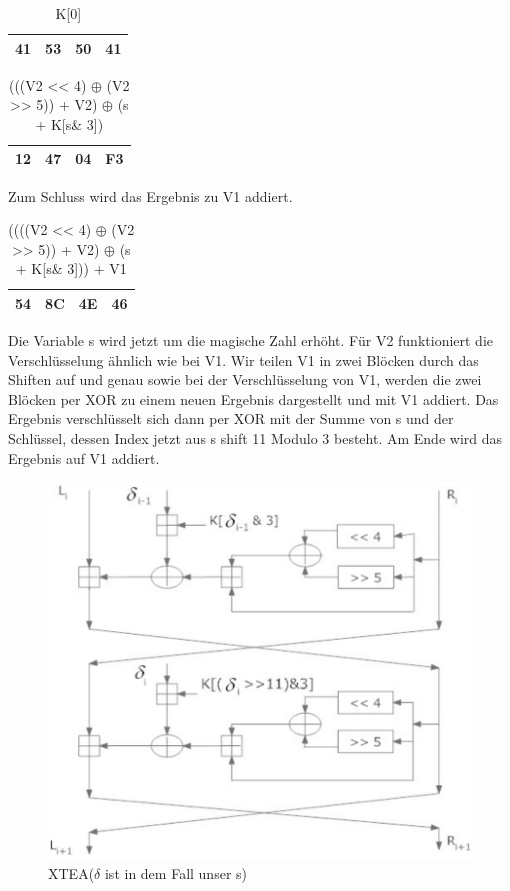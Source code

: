 \documentclass[course=asp]{aspdoc}
\begin{document}
\begin{table}[H]
\centering
    \begin{tabular}{|l|l|l|l|}
        \hline
        41 & 53 & 50 & 41    \\
        \hline
    \end{tabular}
    \caption{K[0]}
\end{table}

\begin{table}[H]
\centering
    \begin{tabular}{|l|l|l|l|}
        \hline
        12 & 47 & 04 & F3    \\
        \hline
    \end{tabular}
    \caption{(((V2 << 4) $\oplus$ (V2 >> 5)) + V2) $\oplus$ (s + K[s\& 3])}
\end{table}
Zum Schluss wird das Ergebnis zu V1 addiert.

\begin{table}[H]
\centering
    \begin{tabular}{|l|l|l|l|}
        \hline
        54 & 8C & 4E & 46    \\
        \hline
    \end{tabular}
    \caption{((((V2 << 4) $\oplus$ (V2 >> 5)) + V2) $\oplus$ (s + K[s\& 3])) + V1}
\end{table}



Die Variable s wird jetzt um die magische Zahl erhöht. Für V2 funktioniert die Verschlüsselung ähnlich wie bei V1. Wir teilen V1 in zwei Blöcken durch das Shiften auf und genau sowie bei der Verschlüsselung von V1, werden die zwei Blöcken per XOR zu einem neuen Ergebnis dargestellt und mit V1 addiert. Das Ergebnis verschlüsselt sich dann per XOR mit der Summe von s und der Schlüssel, dessen Index jetzt aus s shift 11 Modulo 3 besteht. Am Ende wird das Ergebnis auf V1 addiert.
\begin{figure}[h]
\centering
\includegraphics[scale = 0.55]{XTEA.png}
\caption{XTEA(${\delta}$ ist in dem Fall unser s)}
\end{figure}
\newpage
\end{document}
